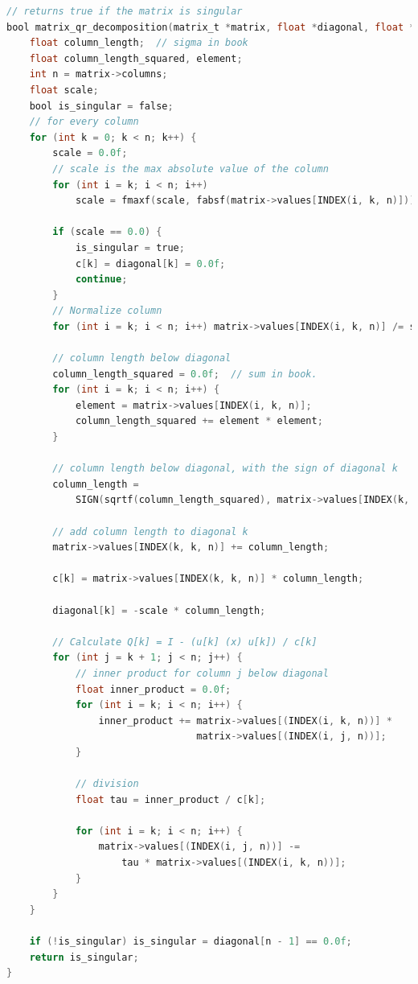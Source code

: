 \begin{lstlisting}[language=C, caption={QR Decomposition on the CPU}, label={lst:qr_decomposition_cpu}]
// returns true if the matrix is singular
bool matrix_qr_decomposition(matrix_t *matrix, float *diagonal, float *c) {
    float column_length;  // sigma in book
    float column_length_squared, element;
    int n = matrix->columns;
    float scale;
    bool is_singular = false;
    // for every column
    for (int k = 0; k < n; k++) {
        scale = 0.0f;
        // scale is the max absolute value of the column
        for (int i = k; i < n; i++)
            scale = fmaxf(scale, fabsf(matrix->values[INDEX(i, k, n)]));

        if (scale == 0.0) {
            is_singular = true;
            c[k] = diagonal[k] = 0.0f;
            continue;
        }
        // Normalize column
        for (int i = k; i < n; i++) matrix->values[INDEX(i, k, n)] /= scale;

        // column length below diagonal
        column_length_squared = 0.0f;  // sum in book.
        for (int i = k; i < n; i++) {
            element = matrix->values[INDEX(i, k, n)];
            column_length_squared += element * element;
        }

        // column length below diagonal, with the sign of diagonal k
        column_length =
            SIGN(sqrtf(column_length_squared), matrix->values[INDEX(k, k, n)]);

        // add column length to diagonal k
        matrix->values[INDEX(k, k, n)] += column_length;

        c[k] = matrix->values[INDEX(k, k, n)] * column_length;

        diagonal[k] = -scale * column_length;

        // Calculate Q[k] = I - (u[k] (x) u[k]) / c[k]
        for (int j = k + 1; j < n; j++) {
            // inner product for column j below diagonal
            float inner_product = 0.0f;
            for (int i = k; i < n; i++) {
                inner_product += matrix->values[(INDEX(i, k, n))] *
                                 matrix->values[(INDEX(i, j, n))];
            }

            // division
            float tau = inner_product / c[k];

            for (int i = k; i < n; i++) {
                matrix->values[(INDEX(i, j, n))] -=
                    tau * matrix->values[(INDEX(i, k, n))];
            }
        }
    }

    if (!is_singular) is_singular = diagonal[n - 1] == 0.0f;
    return is_singular;
}
\end{lstlisting}

